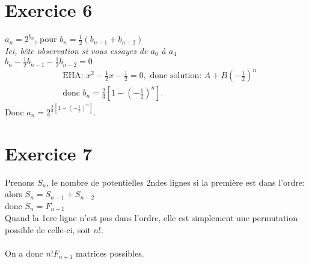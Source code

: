 \documentclass[fontsize=10pt]{article}
\begin{document}
\section*{Exercice 6}
$a_n = 2^{b_n}$, pour $b_n = \frac{1}{2}(b_{n-1} + b_{n-2})$\\
\textit{Ici, bête observation si vous essayez de $a_0$ à $a_4$}\\
$b_n - \frac{1}{2}b_{n-1} - \frac{1}{2}b_{n-2} = 0$
\begin{align*}
& \text{EHA: } x^2 - \frac{1}{2}x - \frac{1}{2} = 0, \text{ donc solution: } A + B(-\frac{1}{2})^n\\
& \text{donc } b_n = \frac{2}{3}\left[ 1 - (- \frac{1}{2})^n \right].
\end{align*}
Donc $a_n = 2^{\frac{2}{3}\left[ 1 - (- \frac{1}{2})^n \right]}$.

\section*{Exercice 7}
Prenons $S_n$, le nombre de potentielles 2ndes lignes si la première est dans l'ordre:\\
alors $S_n = S_{n-1} + S_{n-2}$\\
donc $S_n = F_{n+1}$\\
Quand la 1ere ligne n'est pas dans l'ordre, elle est simplement une permutation possible de celle-ci, soit $n!$.\\\\
On a donc $n!F_{n+1}$ matrices possibles.
\end{document}
